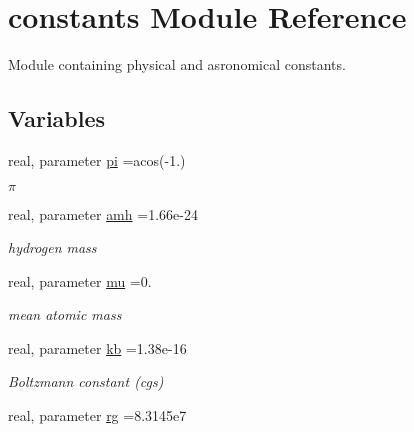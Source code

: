 \hypertarget{namespaceconstants}{}\section{constants Module Reference}
\label{namespaceconstants}


Module containing physical and asronomical constants.  


\subsection*{Variables}
\begin{DoxyCompactItemize}
\item 
\hypertarget{namespaceconstants_a815ad954ef712211ed1b1fdb8be42487}{}real, parameter \hyperlink{namespaceconstants_a815ad954ef712211ed1b1fdb8be42487}{pi} =acos(-\/1.)\label{namespaceconstants_a815ad954ef712211ed1b1fdb8be42487}

\begin{DoxyCompactList}\small\item\em $ \pi $ \end{DoxyCompactList}\item 
\hypertarget{namespaceconstants_aac258d92ad409a5ad7f8748101e932b0}{}real, parameter \hyperlink{namespaceconstants_aac258d92ad409a5ad7f8748101e932b0}{amh} =1.\+66e-\/24\label{namespaceconstants_aac258d92ad409a5ad7f8748101e932b0}

\begin{DoxyCompactList}\small\item\em hydrogen mass \end{DoxyCompactList}\item 
\hypertarget{namespaceconstants_a02d6877af0064a592565cca791e6dfa2}{}real, parameter \hyperlink{namespaceconstants_a02d6877af0064a592565cca791e6dfa2}{mu} =0.\label{namespaceconstants_a02d6877af0064a592565cca791e6dfa2}

\begin{DoxyCompactList}\small\item\em mean atomic mass \end{DoxyCompactList}\item 
\hypertarget{namespaceconstants_afc7b29a52df069e705256c11de562808}{}real, parameter \hyperlink{namespaceconstants_afc7b29a52df069e705256c11de562808}{kb} =1.\+38e-\/16\label{namespaceconstants_afc7b29a52df069e705256c11de562808}

\begin{DoxyCompactList}\small\item\em Boltzmann constant (cgs) \end{DoxyCompactList}\item 
\hypertarget{namespaceconstants_aab4c0a2b0e8b8cda79e9d683b3e650f6}{}real, parameter \hyperlink{namespaceconstants_aab4c0a2b0e8b8cda79e9d683b3e650f6}{rg} =8.\+3145e7\label{namespaceconstants_aab4c0a2b0e8b8cda79e9d683b3e650f6}


\end{DoxyCompactItemize}
